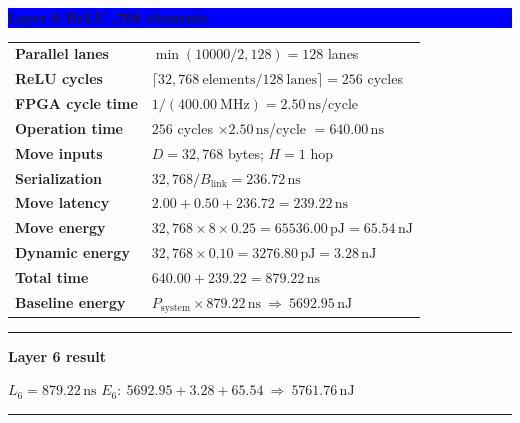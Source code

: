 \documentclass[10pt]{article}
\newcommand{\ns}{\,\mathrm{ns}}
\newcommand{\pj}{\,\mathrm{pJ}}
\newcommand{\nj}{\,\mathrm{nJ}}
\newenvironment{resultbox}[1]
  {\begin{center}\begin{minipage}{0.93\linewidth}\color{green}
   \hrule height 1pt\vspace{0.35em}\textbf{#1}\par\smallskip\color{black}}
  {\vspace{0.25em}\color{green}\hrule height 1pt\end{minipage}\end{center}}
\newcommand{\layerbar}[1]{\vspace{0.35em}\noindent
  \colorbox{blue}{\parbox{\dimexpr\linewidth-2\fboxsep\relax}{
  \color{white}\bfseries #1}}\par\vspace{0.2em}}
\begin{document}
\layerbar{Layer 6 \quad ReLU ,768 elements}
\begin{tabularx}{\linewidth}{@{}L Y@{}}
\textbf{Parallel lanes} & $\min(10000/2,128)=128$ lanes \\
\textbf{ReLU cycles} & $\lceil32{,}768\ \mathrm{elements}/128\ \mathrm{lanes}\rceil=256$ cycles \\
\textbf{FPGA cycle time} & $1/(400.00\ \mathrm{MHz})=2.50\ns$/cycle \\
\textbf{Operation time} & $256$ cycles $\times2.50\ns$/cycle $=640.00\ns$ \\
\textbf{Move inputs} & $D=32{,}768$ bytes; $H=1$ hop \\
\textbf{Serialization} & $32{,}768/B_{\mathrm{link}}=236.72\ns$ \\
\textbf{Move latency} & $2.00+0.50+236.72=239.22\ns$ \\
\textbf{Move energy} & $32{,}768\times8\times0.25=65536.00\pj=65.54\nj$ \\
\textbf{Dynamic energy} & $32{,}768\times0.10=3276.80\pj=3.28\nj$ \\
\textbf{Total time} & $640.00+239.22=879.22\ns$ \\
\textbf{Baseline energy} & $P_{\mathrm{system}}\times879.22\ns\ \Longrightarrow\ 5692.95\nj$ \\
\bottomrule
\end{tabularx}
\begin{resultbox}{Layer 6 result}
$L_6=879.22\ns$ \hfill $E_6:\ 5692.95+3.28+65.54\ \Longrightarrow\ 5761.76\nj$
\end{resultbox}
\end{document}
